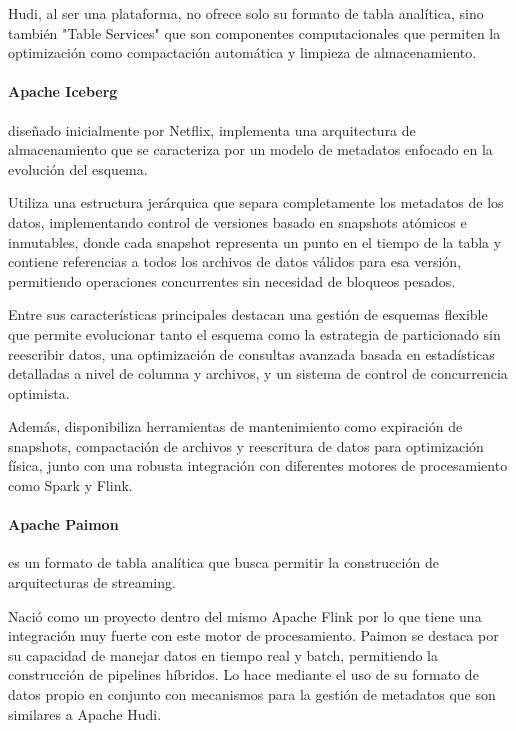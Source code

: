 Hudi, al ser una plataforma, no ofrece solo su formato de tabla analítica, 
sino también "Table Services" que son componentes computacionales que permiten la optimización como compactación automática 
y limpieza de almacenamiento. 

\newpage
\paragraph{Apache Iceberg}diseñado inicialmente por Netflix, implementa una arquitectura de almacenamiento que se caracteriza 
por un modelo de metadatos enfocado en la evolución del esquema. \newline

Utiliza una estructura jerárquica que separa completamente los metadatos de los datos, 
implementando control de versiones basado en snapshots atómicos e inmutables, 
donde cada snapshot representa un punto en el tiempo de la tabla y contiene referencias a todos los archivos de datos válidos para esa versión, 
permitiendo operaciones concurrentes sin necesidad de bloqueos pesados.\newline

Entre sus características principales destacan una gestión de esquemas flexible que permite evolucionar tanto el esquema 
como la estrategia de particionado sin reescribir datos, 
una optimización de consultas avanzada basada en estadísticas detalladas a nivel de columna y archivos, 
y un sistema de control de concurrencia optimista. \newline

Además, disponibiliza herramientas de mantenimiento como expiración de snapshots, compactación de archivos 
y reescritura de datos para optimización física, 
junto con una robusta integración con diferentes motores de procesamiento como Spark y Flink.

\newpage
\paragraph{Apache Paimon} es un formato de tabla analítica que busca permitir la construcción de arquitecturas de streaming.\newline

Nació como un proyecto dentro del mismo Apache Flink por lo que tiene una integración muy fuerte con este motor de procesamiento.
Paimon se destaca por su capacidad de manejar datos en tiempo real y batch, permitiendo la construcción de pipelines híbridos.
Lo hace mediante el uso de su formato de datos propio en conjunto con mecanismos para la gestión de metadatos que son 
similares a Apache Hudi.\newline

